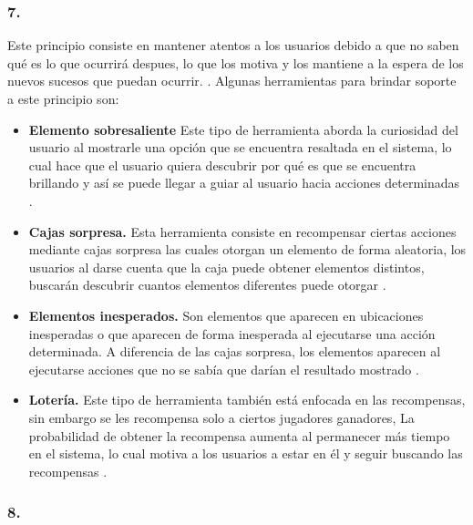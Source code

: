\subsubsection{7. \principioVII}
\label{subsec:principioVII}

 Este principio consiste en mantener atentos a los usuarios debido a que no saben qué es lo que
 ocurrirá despues, lo que los motiva y los mantiene a la espera de los nuevos sucesos que puedan
 ocurrir. \cite[pp. 27, 273]{Octalysis}. Algunas herramientas para brindar soporte a este
 principio son:

    \begin{itemize}
    \item
    {\bf Elemento sobresaliente} %
        Este tipo de herramienta aborda la curiosidad del usuario al mostrarle una opción
        que se encuentra resaltada en el sistema, lo cual hace que el usuario quiera descubrir
        por qué es que se encuentra brillando y así se puede llegar a guiar al usuario hacia
        acciones determinadas \cite[p. 297]{Octalysis}.

    \item
    {\bf Cajas sorpresa.}
        Esta herramienta consiste en recompensar ciertas acciones mediante cajas sorpresa
        las cuales otorgan un elemento de forma aleatoria, los usuarios al darse cuenta que
        la caja puede obtener elementos distintos, buscarán descubrir cuantos elementos diferentes
        puede otorgar \cite[p. 299]{Octalysis}.

    \item
    {\bf Elementos inesperados.} %
        Son elementos que aparecen en ubicaciones inesperadas o que aparecen de forma inesperada
        al ejecutarse una acción determinada. A diferencia de las cajas sorpresa, los elementos
        aparecen al ejecutarse acciones que no se sabía que darían el resultado mostrado
        \cite[p. 301]{Octalysis}.

    \item
    {\bf Lotería.}
        Este tipo de herramienta también está enfocada en las recompensas, sin embargo se les
        recompensa solo a ciertos jugadores ganadores, La probabilidad de obtener la recompensa
        aumenta al permanecer más tiempo en el sistema, lo cual motiva a los usuarios
        a estar en él y seguir buscando las recompensas \cite[p. 305]{Octalysis}.
    \end{itemize}

\clearpage
\subsubsection{8. \principioVIII} \label{subsec:principioVIII}

